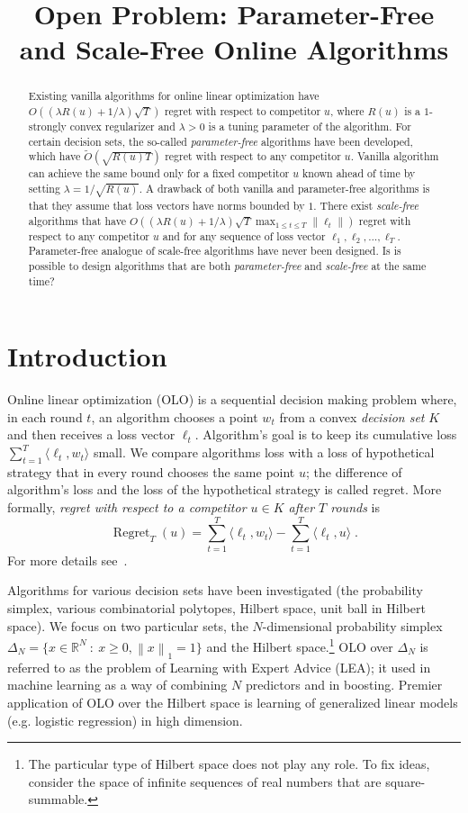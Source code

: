 \documentclass{colt2016} %
\title{Open Problem: Parameter-Free and Scale-Free Online Algorithms}
\DeclareMathOperator{\Regret}{Regret}
\newcommand{\R}{\mathbb{R}}     %
\newcommand{\norm}[1]{\left\|{#1}\right\|}
\begin{document}
\maketitle

\begin{abstract}
Existing vanilla algorithms for online linear optimization have
$O((\lambda R(u) + 1/\lambda) \sqrt{T})$ regret with respect to competitor $u$,
where $R(u)$ is a $1$-strongly convex regularizer and $\lambda > 0$ is a
tuning parameter of the algorithm. For certain decision sets, the
so-called \emph{parameter-free} algorithms have been developed, which have
$\widetilde O(\sqrt{R(u) T})$ regret with respect to any competitor $u$.
Vanilla algorithm can achieve the same bound only for a fixed competitor
$u$ known ahead of time by setting $\lambda = 1/\sqrt{R(u)}$. A drawback of
both vanilla and parameter-free algorithms is that they assume that loss vectors
have norms bounded by $1$. There exist \emph{scale-free} algorithms that have
$O((\lambda R(u) + 1/\lambda) \sqrt{T} \max_{1 \le t \le T} \norm{\ell_t})$
regret with respect to any competitor $u$ and for any sequence of loss
vector $\ell_1, \ell_2, \dots, \ell_T$. Parameter-free analogue of scale-free
algorithms have never been designed. Is is possible to design algorithms that
are both \emph{parameter-free} and \emph{scale-free} at the same time?
\end{abstract}

\section{Introduction}

Online linear optimization (OLO) is a sequential decision making problem where,
in each round $t$, an algorithm chooses a point $w_t$ from a convex
\emph{decision set} $K$ and then receives a loss vector $\ell_t$. Algorithm's
goal is to keep its cumulative loss $\sum_{t=1}^T \langle \ell_t, w_t \rangle$
small. We compare algorithms loss with a loss of hypothetical strategy that in
every round chooses the same point $u$; the difference of algorithm's  loss and
the loss of the hypothetical strategy is called regret. More formally,
\emph{regret with respect to a competitor $u \in K$ after $T$ rounds} is
$$
\Regret_T(u) = \sum_{t=1}^T \langle \ell_t, w_t \rangle - \sum_{t=1}^T \langle \ell_t, u \rangle \; .
$$
For more details see~\cite{Cesa-Bianchi-Lugosi-2006, Shalev-Shwartz-2011}.

Algorithms for various decision sets have been investigated (the probability
simplex, various combinatorial polytopes, Hilbert space, unit ball in Hilbert
space). We focus on two particular sets, the $N$-dimensional probability
simplex $\Delta_N = \{ x \in \R^N ~:~ x \ge 0, \norm{x}_1 = 1\}$ and the
Hilbert space.\footnote{The particular type of Hilbert space does not play any
role. To fix ideas, consider the space of infinite sequences of real numbers
that are square-summable.} OLO over $\Delta_N$ is referred to as the problem of
Learning with Expert Advice (LEA); it used in machine learning as a way of
combining $N$ predictors and in boosting. Premier application of OLO over the
Hilbert space is learning of generalized linear models (e.g. logistic
regression) in high dimension.
\end{document}

